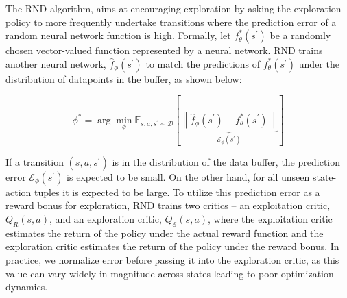 The RND algorithm, aims at encouraging exploration by asking the exploration policy to more frequently undertake transitions where the prediction error of a random neural network function is high. Formally, let $f_\theta^*\left(s^{\prime}\right)$ be a randomly chosen vector-valued function represented by a neural network. RND trains another neural network, $\hat{f}_\phi\left(s^{\prime}\right)$ to match the predictions of $f_\theta^*\left(s^{\prime}\right)$ under the distribution of datapoints in the buffer, as shown below:

\begin{equation}
    \phi^*=\arg \min _\phi \mathbb{E}_{s, a, s^{\prime} \sim \mathcal{D}}[\underbrace{\left\|\hat{f}_\phi\left(s^{\prime}\right)-f_\theta^*\left(s^{\prime}\right)\right\|}_{\mathcal{E}_\phi\left(s^{\prime}\right)}]
\end{equation}

If a transition $(s,a,s^\prime)$ is in the distribution of the data buffer, the prediction error $\mathcal{E}_\phi(s^\prime)$ is expected to be small. On the other hand, for all unseen state-action tuples it is expected to be large. To utilize this prediction error as a reward bonus for exploration, RND trains two critics – an exploitation critic, $Q_R(s,a)$, and an exploration critic, $Q_\mathcal{E} (s, a)$, where the exploitation critic estimates the return of the policy under the actual reward function and the exploration critic estimates the return of the policy under the reward bonus. In practice, we normalize error before passing it into the exploration critic, as this value can vary widely in magnitude across states leading to poor optimization dynamics.


\newpage